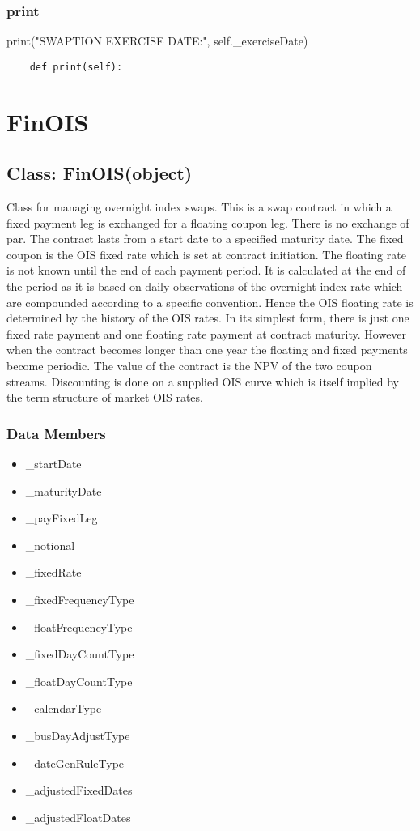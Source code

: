 \documentclass[twoside,11pt]{book}
\begin{document}
\subsubsection*{{\bf print}}
print("SWAPTION EXERCISE DATE:", self.\_exerciseDate) 

\begin{lstlisting}
    def print(self):
\end{lstlisting}

\newpage
\section{FinOIS}

\subsection*{Class: FinOIS(object)}
Class for managing overnight index swaps. This is a swap contract in which a fixed payment leg is exchanged for a floating coupon leg. There is no exchange of par.  The contract lasts from a start date to a specified maturity date.  The fixed coupon is the OIS fixed rate which is set at contract initiation.  The floating rate is not known until the end of each payment period. It is calculated at the end of the period as it is based on daily observations of the overnight index rate which are compounded according to a specific convention. Hence the OIS floating rate is determined by the history of the OIS rates.  In its simplest form, there is just one fixed rate payment and one floating rate payment at contract maturity. However when the contract becomes longer than one year the floating and fixed payments become periodic.  The value of the contract is the NPV of the two coupon streams. Discounting is done on a supplied OIS curve which is itself implied by the term structure of market OIS rates.  

\subsubsection*{Data Members}
\begin{itemize}
\item{\_startDate}
\item{\_maturityDate}
\item{\_payFixedLeg}
\item{\_notional}
\item{\_fixedRate}
\item{\_fixedFrequencyType}
\item{\_floatFrequencyType}
\item{\_fixedDayCountType}
\item{\_floatDayCountType}
\item{\_calendarType}
\item{\_busDayAdjustType}
\item{\_dateGenRuleType}
\item{\_adjustedFixedDates}
\item{\_adjustedFloatDates}
\end{itemize}
\end{document}
